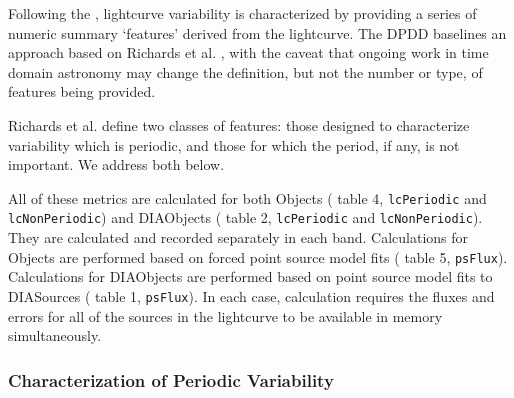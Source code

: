 Following the \DPDD{}, lightcurve variability is characterized by providing a series of numeric summary `features' derived from the lightcurve. The DPDD baselines an approach based on Richards et al. \cite{Richards11}, with the caveat that ongoing work in time domain astronomy may change the definition, but not the number or type, of features being provided.

Richards et al. define two classes of features: those designed to characterize variability which is periodic, and those for which the period, if any, is not important. We address both below.

All of these metrics are calculated for both Objects (\DPDD{} table 4, \texttt{lcPeriodic} and \texttt{lcNonPeriodic}) and DIAObjects (\DPDD{} table 2, \texttt{lcPeriodic} and \texttt{lcNonPeriodic}). They are calculated and recorded separately in each band. Calculations for Objects are performed based on forced point source model fits (\DPDD{} table 5, \texttt{psFlux}).  Calculations for DIAObjects are performed based on point source model fits to DIASources (\DPDD{} table 1, \texttt{psFlux}). In each case, calculation requires the fluxes and errors for all of the sources in the lightcurve to be available in memory simultaneously.

\subsubsection{Characterization of Periodic Variability}

